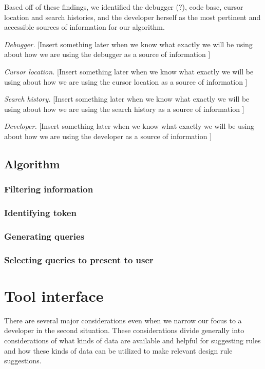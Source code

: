 \documentclass[12pt]{article}
\begin{document}
Based off of  these findings, we identified the debugger (?), code base, cursor location and search histories, and the developer herself as the most pertinent and accessible sources of information for our algorithm.

\textit{Debugger.} [Insert something later when we know what exactly we will be using about how we are using the debugger as a source of information ]

\textit{Cursor location.} [Insert something later when we know what exactly we will be using about how we are using the cursor location as a source of information ]

\textit{Search history.} [Insert something later when we know what exactly we will be using about how we are using the search history as a source of information ]

\textit{Developer.} [Insert something later when we know what exactly we will be using about how we are using the developer as a source of information ]



\subsection{Algorithm} \label{algm}

\subsubsection{Filtering information}
\subsubsection{Identifying token}
\subsubsection{Generating queries}
\subsubsection{Selecting queries to present to user}

\clearpage


\section{Tool interface} \label{toolInterface}
There are several major considerations even when we narrow our focus to a developer in the second situation. These considerations divide generally into considerations of what kinds of data are available and helpful for suggesting rules and how these kinds of data can be utilized to make relevant design rule suggestions.
\end{document}
